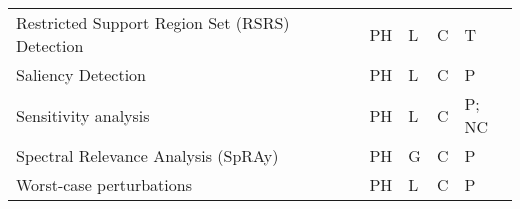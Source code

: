\documentclass[final,1p,times]{elsarticle}
\begin{document}
\begin{table}[h!]
\begin{tabular}{m{4.5cm} m{2.2cm} m{0.5cm} m{0.5cm} m{0.5cm} m{0.5cm} m{0.7cm} m{0.7cm}}
    Restricted Support Region Set (RSRS) Detection &  \citeauthor{liu2012has} &  \cite{liu2012has} &  \citeyear{liu2012has} & PH & L & C & T\\
    Saliency Detection & \citeauthor{dabkowski2017real} & \cite{dabkowski2017real} & \citeyear{dabkowski2017real} & PH & L & C & P\\
    Sensitivity analysis & \citeauthor{baehrens2010explain} & \cite{baehrens2010explain} &  \citeyear{baehrens2010explain} & PH & L & C & P; NC\\
    Spectral Relevance Analysis (SpRAy) & \citeauthor{lapuschkin2019unmasking} & \cite{lapuschkin2019unmasking} & \citeyear{lapuschkin2019unmasking} & PH & G & C & P\\
    Worst-case perturbations & \citeauthor{goodfellow2015explaining} & \cite{goodfellow2015explaining} & \citeyear{goodfellow2015explaining} & PH & L & C & P\\
    \hline
\end{tabular}
\end{table}
\end{document}
